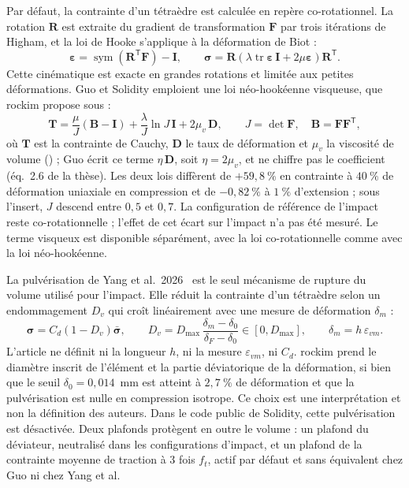 Par défaut, la contrainte d'un tétraèdre est calculée en repère co-rotationnel. La rotation $\mathbf R$ est extraite du gradient de transformation $\mathbf F$ par trois itérations de Higham, et la loi de Hooke s'applique à la déformation de Biot :
\begin{equation}
\boldsymbol\varepsilon = \operatorname{sym}(\mathbf R^{\mathsf T}\mathbf F) - \mathbf I, \qquad
\boldsymbol\sigma = \mathbf R \left(\lambda \operatorname{tr}\boldsymbol\varepsilon\, \mathbf I + 2\mu\boldsymbol\varepsilon\right) \mathbf R^{\mathsf T} .
\label{eq-corot}
\end{equation}
Cette cinématique est exacte en grandes rotations et limitée aux petites déformations. Guo et Solidity emploient une loi néo-hookéenne visqueuse, que rockim propose sous  :
\begin{equation}
\mathbf T = \frac{\mu}{J}(\mathbf B - \mathbf I) + \frac{\lambda}{J}\ln J\, \mathbf I + 2\mu_v\, \mathbf D, \qquad J = \det\mathbf F,\quad \mathbf B = \mathbf F\mathbf F^{\mathsf T},
\label{eq-nh}
\end{equation}
où $\mathbf T$ est la contrainte de Cauchy, $\mathbf D$ le taux de déformation et $\mu_v$ la viscosité de volume () ; Guo écrit ce terme $\eta\,\mathbf D$, soit $\eta = 2\mu_v$, et ne chiffre pas le coefficient (éq.~{2.6} de la thèse). Les deux lois diffèrent de $+59{,}8~\%$ en contrainte à $40~\%$ de déformation uniaxiale en compression et de $-0{,}82~\%$ à $1~\%$ d'extension ; sous l'insert, $J$ descend entre $0{,}5$ et $0{,}7$. La configuration de référence de l'impact reste co-rotationnelle ; l'effet de cet écart sur l'impact n'a pas été mesuré. Le terme visqueux est disponible séparément, avec la loi co-rotationnelle comme avec la loi néo-hookéenne.

La pulvérisation de Yang et al.~2026~\cite{yang2026pulverisation} est le seul mécanisme de rupture du volume utilisé pour l'impact. Elle réduit la contrainte d'un tétraèdre selon un endommagement $D_v$ qui croît linéairement avec une mesure de déformation $\delta_m$ :
\begin{equation}
\boldsymbol\sigma = C_d(1 - D_v)\bar{\boldsymbol\sigma}, \qquad
D_v = D_\text{max}\,\frac{\delta_m - \delta_0}{\delta_F - \delta_0} \in [0, D_\text{max}], \qquad \delta_m = h\,\varepsilon_{vm} .
\label{eq-pulv}
\end{equation}
L'article ne définit ni la longueur $h$, ni la mesure $\varepsilon_{vm}$, ni $C_d$. rockim prend le diamètre inscrit de l'élément et la partie déviatorique de la déformation, si bien que le seuil $\delta_0 = 0{,}014$~mm est atteint à $2{,}7~\%$ de déformation et que la pulvérisation est nulle en compression isotrope. Ce choix est une interprétation et non la définition des auteurs. Dans le code public de Solidity, cette pulvérisation est désactivée. Deux plafonds protègent en outre le volume : un plafond du déviateur, neutralisé dans les configurations d'impact, et un plafond de la contrainte moyenne de traction à 3 fois $f_t$, actif par défaut et sans équivalent chez Guo ni chez Yang et al.

